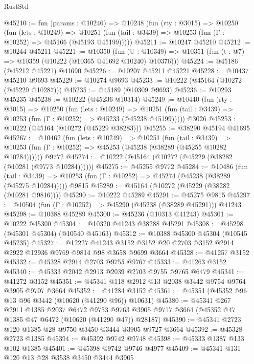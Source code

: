 \begin{lexlean}{RustStd}
\begin{coremodule}
@45210 := fun (params : @10246) =>
  @10248
    (fun (rty : @3015) =>
    @10250
      (fun (lets : @10249) =>
      @10251 (fun (tail : @3439) => @10253 (fun (Γ : @10252) => @45166 (@45193 @45199)))))
@45211 := @10247 @45210
@45212 := @10244 @45211
@45221 := @10350
    (fun (U : @10349) => @10351 (fun (t : @7) => @10359 (@10222 (@10365 @41692 @10240) @10376)))
@45224 := @45186 (@45212 @45221) @41690
@45226 := @10207 @45211 @45221
@45228 := @10437 @45210 @9693
@45229 := @10274 @9693
@45233 := @10222 (@45164 (@10272 (@45229 @10287)))
@45235 := @45189 (@10309 @9693)
@45236 := @10293 @45235
@45238 := @10222 (@45236 @10314)
@45249 := @10440
    (fun (rty : @3015) =>
    @10250
      (fun (lets : @10249) =>
      @10251 (fun (tail : @3439) => @10253 (fun (Γ : @10252) => @45233 (@45238 @45199)))))
    @3026
@45253 := @10222 (@45164 (@10272 (@45229 @38283)))
@45255 := @38290 @45194 @41695
@45267 := @10462
    (fun (lets : @10249) =>
    @10251
      (fun (tail : @3439) =>
      @10253 (fun (Γ : @10252) => @45253 (@45238 (@38289 (@45255 @10282 @10284))))))
    @9772
@45274 := @10222 (@45164 (@10272 (@45229 (@38282 (@10281 (@9773 @10284))))))
@45275 := @45255 @9772
@45284 := @10486
    (fun (tail : @3439) => @10253 (fun (Γ : @10252) => @45274 (@45238 (@38289 (@45275 @10284)))))
    @9815
@45289 := @45164 (@10272 (@45229 (@38282 (@10281 @9816))))
@45290 := @10222 @45289
@45291 := @45275 @9815
@45297 := @10504 (fun (Γ : @10252) => @45290 (@45238 (@38289 @45291))) @41243
@45298 := @10388 @45289
@45300 := @45236 (@10313 @41243)
@45301 := @10222 @45300
@45304 := @10320 @41243 @38288 @45291
@45308 := @45298 (@45301 @45304) (@10540 @45163)
@45312 := @10388 @45300 @45304 (@10545 @45235)
@45327 := @12227
    @41243
    @3152
    @3152
    @20
    @2703
    @3152
    @2914
    @2922
    @12936
    @9769
    @9814
    @98
    @3658
    @9699
    @3664
@45328 := @41257 @3152
@45332 := @45328 @2914 @2703 @9755 @9767
@45333 := @41263 @3152
@45340 := @45333 @2042 @2913 @2039 @2703 @9755 @9765 @6479
@45341 := @41272 @3152
@45351 := @45341 @118 @2912 @13 @2038 @3442 @9754 @9764 @3905 @9707 @3664
@45352 := @41284 @3152
@45361 := @45351 (@45352 @96 @13 @96 @3442 (@10620 (@41290 @96)) @10631)
@45380 := @45341
    @267
    @2911
    @1385
    @2037
    @6472
    @9753
    @9763
    @3905
    @9717
    @3664
    (@45352 @47 @1385 @47 @6472 (@10620 (@41290 @47)) @28187)
@45390 := @45341 @2723 @120 @1385 @28 @9750 @3450 @3444 @3905 @9727 @3664
@45392 := @45328 @2723 @1385
@45394 := @45392 @9742 @9748
@45398 := @45333 @1387 @133 @102 @1385
@45401 := @45398 @9742 @9746 @4977
@45409 := @45341 @131 @120 @13 @28 @3538 @3450 @3444 @3905

\end{coremodule}
\end{lexlean}
